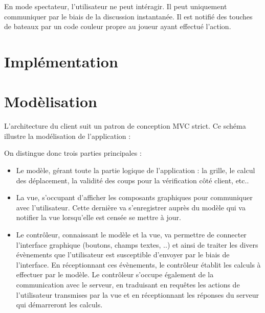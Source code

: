 \documentclass[a4paper, 11pt]{report}
\begin{document}
En mode spectateur, l'utilisateur ne peut intéragir. Il peut uniquement communiquer par le biais
de la discussion instantanée. Il est notifié des touches de bateaux par un code couleur
propre au joueur ayant effectué l'action.

\section{Implémentation}

\section{Modèlisation}
L'architecture du client suit un patron de conception MVC strict.
Ce schéma illustre la modélisation de l'application :



On distingue donc trois parties principales :
\begin{itemize}
  \item Le modèle, gérant toute la partie logique de l'application : la grille, le calcul des déplacement, la validité des coups pour la vérification côté client, etc..
  \item La vue, s'occupant d'afficher les composants graphiques pour communiquer avec l'utilisateur.
    Cette dernière va s'enregistrer auprès du modèle qui va notifier la vue lorsqu'elle est censée
    se mettre à jour.
  \item Le contrôleur, connaissant le modèle et la vue, va permettre de connecter l'interface
    graphique (boutons, champs textes, ..) et ainsi de traiter les divers évènements que 
    l'utilisateur est susceptible d'envoyer par le biais de l'interface. En réceptionnant ces
    évènements, le contrôleur établit les calculs à effectuer par le modèle. Le contrôleur 
    s'occupe également de la communication avec le serveur, en traduisant en requêtes
    les actions de l'utilisateur transmises par la vue et en réceptionnant les réponses du
    serveur qui démarreront les calculs.
\end{itemize}
\end{document}
